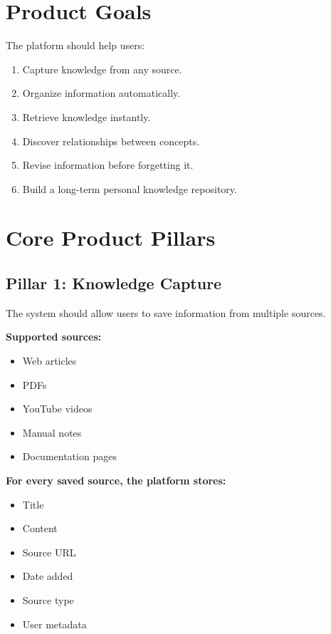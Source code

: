 \documentclass[11pt]{article}
\begin{document}
\section{Product Goals}

The platform should help users:

\begin{enumerate}[nosep]
    \item Capture knowledge from any source.
    \item Organize information automatically.
    \item Retrieve knowledge instantly.
    \item Discover relationships between concepts.
    \item Revise information before forgetting it.
    \item Build a long-term personal knowledge repository.
\end{enumerate}

\section{Core Product Pillars}

\subsection{Pillar 1: Knowledge Capture}

The system should allow users to save information from multiple sources.

\textbf{Supported sources:}
\begin{itemize}[nosep]
    \item Web articles
    \item PDFs
    \item YouTube videos
    \item Manual notes
    \item Documentation pages
\end{itemize}

\textbf{For every saved source, the platform stores:}
\begin{itemize}[nosep]
    \item Title
    \item Content
    \item Source URL
    \item Date added
    \item Source type
    \item User metadata
\end{itemize}
\end{document}
